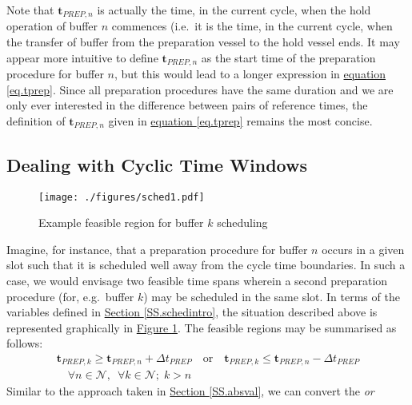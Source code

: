 Note that $\boldsymbol{t}_{\mathit{PREP},n}$ is actually the time, in the
current cycle, when the hold operation of buffer $n$ commences (i.e.\ it is the
time, in the current cycle, when the transfer of buffer from the preparation
vessel to the hold vessel ends.  It may appear more intuitive to define
$\boldsymbol{t}_{\mathit{PREP},n}$ as the start time of the preparation
procedure for buffer $n$, but this would lead to a longer expression in
\hyperref[eq.tprep]{equation \ref*{eq.tprep}}.
Since all preparation procedures have the same duration and we are only ever
interested in the difference between pairs of reference times, the definition
of $\boldsymbol{t}_{\mathit{PREP},n}$ given in
\hyperref[eq.tprep]{equation \ref*{eq.tprep}} remains
the most concise.

\subsection{Dealing with Cyclic Time Windows}
\label{SS.cyclic}
\begin{figure}
    \centering
    \texttt{[image: ./figures/sched1.pdf]}
    \caption{Example feasible region for buffer $k$ scheduling}
    \label{fig.sched1}
\end{figure}
Imagine, for instance, that a preparation procedure for buffer $n$ occurs in a
given slot such that it is scheduled well away from the cycle time boundaries.
In such a case, we would envisage two feasible time spans wherein a second
preparation procedure (for, e.g.\ buffer $k$) may be scheduled in the same
slot.
In terms of the variables defined in 
\hyperref[SS.schedintro]{Section \ref*{SS.schedintro}}, the situation described
above is represented graphically in 
\hyperref[fig.sched1]{Figure \ref*{fig.sched1}}.
The feasible regions may be summarised as follows:
\begin{equation}
    \begin{split}
        \boldsymbol{t}_{\mathit{PREP},k} \ge \boldsymbol{t}_{\mathit{PREP},n} 
        + \Delta t_{\mathit{PREP}} \quad \text{or} \quad 
        \boldsymbol{t}_{\mathit{PREP},k} \le \boldsymbol{t}_{\mathit{PREP},n}
        - \Delta t_{\mathit{PREP}}\\
        \quad \forall n \in \mathcal{N}, \enspace \forall k \in \mathcal{N}; \;
        k > n
    \end{split}    
    \label{eq.k0}
\end{equation}
Similar to the approach taken in 
\hyperref[SS.absval]{Section \ref*{SS.absval}}, we can convert the \emph{or}
